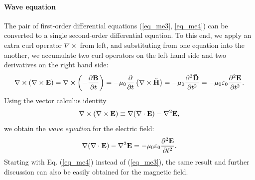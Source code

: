 \documentclass[letterpaper,12pt]{report}
\begin{document}
\paragraph{Wave equation} The pair of first-order differential equations (\ref{eq_me3}, \ref{eq_me4}) can be converted to a single second-order differential equation. To this end, we apply an extra curl operator $\nabla\times$ from left, and substituting from one equation into the another, we accumulate two curl operators on the left hand side and two derivatives on the right hand side: %
\begin{equation} \nabla\times (\nabla\times \mathbf{E}) = \nabla\times \left(- \frac{\partial \mathbf{B}} {\partial t}\right) = -\mu_0 \frac{\partial}{\partial t} \left(\nabla\times \mathbf{\tilde{H}}\right) 
= -\mu_0 \frac{\partial^{2} \mathbf{\tilde{D}}}{\partial t^{2}} = -\mu_0 \varepsilon_0 \frac{\partial^{2} \mathbf{E}}{\partial t^{2}}.  \label{eq_elim}\end{equation}
Using the vector calculus identity
\begin{equation} \nabla\times (\nabla\times \mathbf{E}) \equiv \nabla (\nabla \cdot \mathbf{E}) - \nabla^2 \mathbf{E}, \label{eq_rotrot}\end{equation}
we obtain the \textit{wave equation} for the electric field: 
\begin{equation}  \nabla (\nabla \cdot \mathbf{E}) - \nabla^2 \mathbf{E} = -\mu_0 \varepsilon_0 \frac{\partial^{2} \mathbf{E}}{\partial t^{2}}.  \label{eq_wave}\end{equation}
Starting with Eq. (\ref{eq_me4}) instead of (\ref{eq_me3}), the same result and further discussion can also be easily obtained for the magnetic field.
\end{document}
